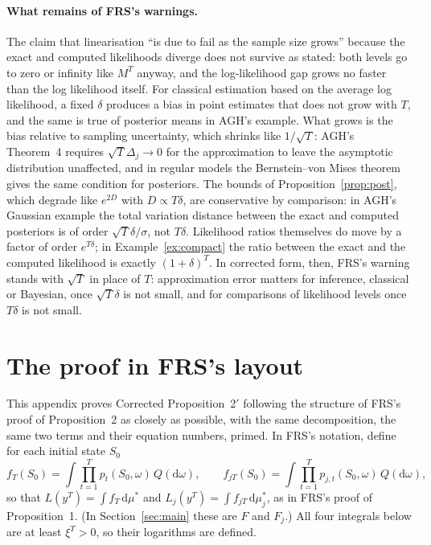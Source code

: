 \documentclass[11pt]{article}
\theoremstyle{definition}
\theoremstyle{remark}
\newcommand{\dd}{\mathrm{d}}
\begin{document}
\paragraph{What remains of FRS's warnings.} The claim that linearisation ``is due to fail as the
sample size grows'' because the exact and computed likelihoods diverge does not survive as stated:
both levels go to zero or infinity like $M^T$ anyway, and the log-likelihood gap grows no faster
than the log likelihood itself. For classical estimation based on the average log likelihood, a
fixed $\delta$ produces a bias in point estimates that does not grow with $T$, and the same is
true of posterior means in AGH's example. What grows is the bias relative to sampling
uncertainty, which shrinks like $1/\sqrt{T}$: AGH's Theorem~4 requires $\sqrt{T}\Delta_j \to 0$
for the approximation to leave the asymptotic distribution unaffected, and in regular models the
Bernstein--von Mises theorem gives the same condition for posteriors. The bounds of
Proposition~\ref{prop:post}, which degrade like $e^{2D}$ with $D \propto T\delta$, are
conservative by comparison: in AGH's Gaussian example the total variation distance between the
exact and computed posteriors is of order $\sqrt{T}\delta/\sigma$, not $T\delta$. Likelihood
ratios themselves do move by a factor of order $e^{T\delta}$; in Example~\ref{ex:compact} the
ratio between the exact and the computed likelihood is exactly $(1+\delta)^T$. In corrected form,
then, FRS's warning stands with $\sqrt{T}$ in place of $T$: approximation error matters for
inference, classical or Bayesian, once $\sqrt{T}\delta$ is not small, and for comparisons of
likelihood levels once $T\delta$ is not small.




\appendix

\section{The proof in FRS's layout}\label{app:frsproof}

This appendix proves Corrected Proposition~2$'$ following the structure of FRS's proof of
Proposition~2 as closely as possible, with the same decomposition, the same two terms and their
equation numbers, primed. In FRS's notation, define for each initial state $S_0$
\[
  f_T(S_0) = \int \prod_{t=1}^T p_t(S_0,\omega)\,Q(\dd\omega), \qquad
  f_{jT}(S_0) = \int \prod_{t=1}^T p_{j,t}(S_0,\omega)\,Q(\dd\omega),
\]
so that $L(y^T) = \int f_T\,\dd\mu^*$ and $L_j(y^T) = \int f_{jT}\,\dd\mu_j^*$, as in FRS's proof of
Proposition~1. (In Section~\ref{sec:main} these are $F$ and $F_j$.) All four integrals below are
at least $\xi^T > 0$, so their logarithms are defined.
\end{document}
